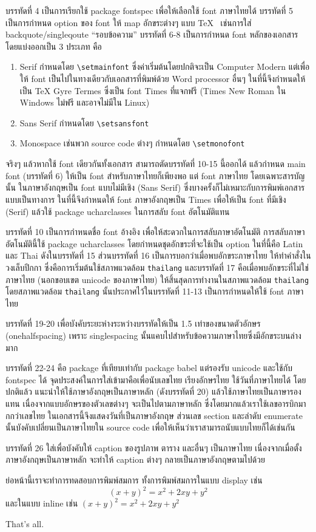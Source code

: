 \documentclass[a4paper,11pt]{article}
\begin{document}
บรรทัดที่ 4 เป็นการเรียกใช้ package fontspec เพื่อให้เลือกใช้ font ภาษาไทยได้
บรรทัดที่ 5 เป็นการกำหนด option ของ font ให้ map อักขระต่างๆ แบบ \TeX~ เช่นการใส่ backquote/singleqoute ``รอบข้อความ'' บรรทัดที่ 6-8 เป็นการกำหนด font หลักของเอกสาร โดยแบ่งออกเป็น 3 ประเภท คือ
\renewcommand{\theenumi}{\arabic{enumi}}
\begin{enumerate}
    \item Serif กำหนดโดย \lstinline|\setmainfont| ซึ่งค่าเริ่มต้นโดยปกติจะเป็น Computer Modern แต่เพื่อให้ font เป็นไปในทางเดียวกับเอกสารที่พิมพ์ด้วย Word processor อื่นๆ ในที่นี้จึงกำหนดให้เป็น TeX Gyre Termes ซึ่งเป็น font Times ที่แจกฟรี (Times New Roman ใน Windows ไม่ฟรี และอาจไม่มีใน Linux)
    \item Sans Serif กำหนดโดย \lstinline|\setsansfont|
    \item Monospace เช่นพวก source code ต่างๆ กำหนดโดย \lstinline|\setmonofont|
\end{enumerate}

จริงๆ แล้วหากใช้ font เดียวกันทั้งเอกสาร สามารถตัดบรรทัดที่ 10-15 นี้ออกได้ แล้วกำหนด main font (บรรทัดที่ 6) ให้เป็น font สำหรับภาษาไทยก็เพียงพอ แต่ font ภาษาไทย โดยเฉพาะสารบัญนั้น ในภาษาอังกฤษเป็น font แบบไม่มีเชิง (Sans Serif) ซึ่งบางครั้งก็ไม่เหมาะกับการพิมพ์เอกสารแบบเป็นทางการ ในที่นี้จึงกำหนดให้ font ภาษาอังกฤษเป็น Times เพื่อให้เป็น font ที่มีเชิง (Serif) แล้วใช้ package ucharclasses ในการสลับ font อัตโนมัติแทน

บรรทัดที่ 10 เป็นการกำหนดชื่อ font อ้างอิง เพื่อให้สะดวกในการสลับภาษาอัตโนมัติ การสลับภาษาอัตโนมัตินี้ใช้ package ucharclasses โดยกำหนดชุดอักขระที่จะใช้เป็น option ในที่นี้คือ Latin และ Thai ดังในบรรทัดที่ 15 ส่วนบรรทัดที่ 16 เป็นการบอกว่าเมื่อพบอักขระภาษาไทย ให้ทำคำสั่งในวงเล็บปีกกา ซึ่งคือการเริ่มต้นใช้สภาพแวดล้อม \lstinline|thailang| และบรรทัดที่ 17 คือเมื่อพบอักขระที่ไม่ใช่ภาษาไทย (นอกขอบเขต unicode ของภาษาไทย) ให้สิ้นสุดการทำงานในสภาพแวดล้อม \lstinline|thailang| โดยสภาพแวดล้อม \lstinline|thailang| นั้นประกาศไว้ในบรรทัดที่ 11-13 เป็นการกำหนดให้ใช้ font ภาษาไทย

บรรทัดที่ 19-20 เพื่อบังคับระยะห่างระหว่างบรรทัดให้เป็น 1.5 เท่าของขนาดตัวอักษร (onehalfspacing) เพราะ singlespacing นั้นแคบไปสำหรับข้อความภาษาไทยซึ่งมีอักขระบนล่างมาก

บรรทัดที่ 22-24 คือ package ที่เทียบเท่ากับ package babel แต่รองรับ unicode และใช้กับ fontspec ได้ จุดประสงค์ในการใส่เข้ามาคือเพื่อนับเลขไทย เรียงอักษรไทย ใช้วันที่ภาษาไทยได้ โดยปกติแล้ว แนะนำให้ใช้ภาษาอังกฤษเป็นภาษาหลัก (ดังบรรทัดที่ 20) แล้วใช้ภาษาไทยเป็นภาษารองแทน  เนื่องจากแบบอักษรของตัวเลขต่างๆ จะเป็นไปตามภาษาหลัก ซึ่งโดยมากแล้วเราใช้เลขอารบิกมากกว่าเลขไทย ในเอกสารนี้จึงแสดงวันที่เป็นภาษาอังกฤษ ส่วนเลข section และลำดับ enumerate นั้นบังคับเปลี่ยนเป็นภาษาไทยใน source code เพื่อให้เห็นว่าเราสามารถนับแบบไทยก็ได้เช่นกัน

บรรทัดที่ 26 ใส่เพื่อบังคับให้ caption ของรูปภาพ ตาราง และอื่นๆ เป็นภาษาไทย เนื่องจากเมื่อตั้งภาษาอังกฤษเป็นภาษาหลัก จะทำให้ caption ต่างๆ กลายเป็นภาษาอังกฤษตามไปด้วย

ย่อหน้านี้เราจะทำการทดสอบการพิมพ์สมการ ทั้งการพิมพ์สมการในแบบ display เช่น $$(x+y)^2 = x^2 + 2xy + y^2$$  และในแบบ inline เช่น $(x+y)^2 = x^2 + 2xy + y^2$

That's all.
\end{document}
